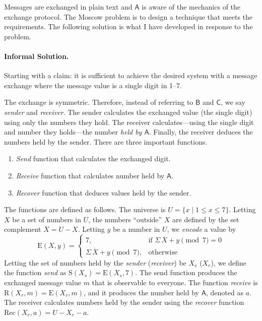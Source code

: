 Messages are exchanged in plain text and \(\mathsf{A}\) is aware of the mechanics of the exchange protocol.
The Moscow problem is to design a technique that meets the requirements.
The following solution is what I have developed in response to the problem.

\paragraph*{Informal Solution.}
Starting with a claim: it is sufficient to achieve the desired system with a message exchange where the message value is a single digit in 1--7.

The exchange is symmetric.
Therefore, instead of referring to \(\mathsf{B}\) and \(\mathsf{C}\), we say \emph{sender} and \emph{receiver}.
The sender calculates the exchanged value (the single digit) using only the numbers they hold.
The receiver calculates---using the single digit and number they holds---the number \emph{held by \(\mathsf{A}\)}.
Finally, the receiver deduces the numbers held by the sender.
There are three important functions.
\begin{enumerate}
\item \emph{Send} function that calculates the exchanged digit.
\item \emph{Receive} function that calculates number held by \(\mathsf{A}\).
\item \emph{Recover} function that deduces values held by the sender.
\end{enumerate}

The functions are defined as follows.
The universe is \(U = \{ x \mid 1 \leq x \leq 7 \}\).
Letting \(X\) be a set of numbers in \(U\), the numbers \enquote{outside} \(X\) are defined by
the set complement \(\overline{X} = U - X\).
Letting \(y\) be a number in \(U\), we \emph{encode} a value by
\[\text{E}(X, y) =
\begin{cases}
7, & \text{if } \Sigma\,\overline{X} + y\pmod{7} = 0 \\
\Sigma\,\overline{X} + y\pmod{7}, & \text{otherwise}
\end{cases}\]
Letting the set of numbers held by the \emph{sender} (\resp \emph{receiver}) be \(X_s\) (\resp \(X_r\)),
we define the function \emph{send} as \(\text{S}(X_s) = \text{E}(X_s, 7)\).
The send function produces the exchanged message value \(m\) that is observable to everyone.
The function \emph{receive} is \(\text{R}(X_r,m) = \text{E}(X_r, m)\),
and it produces the number held by \(\mathsf{A}\), denoted as \(a\).
The receiver calculates numbers held by the sender using the \emph{recover} function \(\text{Rec}(X_r, a) = U - X_r - a\).

